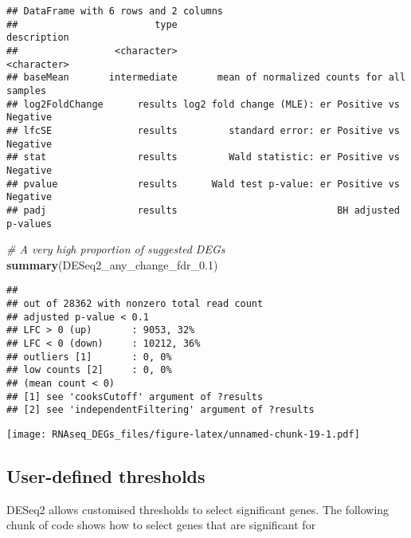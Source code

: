 \documentclass[]{book}
\newenvironment{Shaded}{\begin{snugshade}}{\end{snugshade}}
\newcommand{\KeywordTok}[1]{\textcolor[rgb]{0.13,0.29,0.53}{\textbf{#1}}}
\newcommand{\FloatTok}[1]{\textcolor[rgb]{0.00,0.00,0.81}{#1}}
\newcommand{\CommentTok}[1]{\textcolor[rgb]{0.56,0.35,0.01}{\textit{#1}}}
\newcommand{\OperatorTok}[1]{\textcolor[rgb]{0.81,0.36,0.00}{\textbf{#1}}}
\newcommand{\NormalTok}[1]{#1}
\begin{document}
\begin{verbatim}
## DataFrame with 6 rows and 2 columns
##                        type                                     description
##                 <character>                                     <character>
## baseMean       intermediate       mean of normalized counts for all samples
## log2FoldChange      results log2 fold change (MLE): er Positive vs Negative
## lfcSE               results         standard error: er Positive vs Negative
## stat                results         Wald statistic: er Positive vs Negative
## pvalue              results      Wald test p-value: er Positive vs Negative
## padj                results                            BH adjusted p-values
\end{verbatim}

\begin{Shaded}
\begin{Highlighting}[]
\CommentTok{# A very high proportion of suggested DEGs}
\KeywordTok{summary}\NormalTok{(DESeq2_any_change_fdr_}\FloatTok{0.1}\NormalTok{)}
\end{Highlighting}
\end{Shaded}

\begin{verbatim}
## 
## out of 28362 with nonzero total read count
## adjusted p-value < 0.1
## LFC > 0 (up)       : 9053, 32%
## LFC < 0 (down)     : 10212, 36%
## outliers [1]       : 0, 0%
## low counts [2]     : 0, 0%
## (mean count < 0)
## [1] see 'cooksCutoff' argument of ?results
## [2] see 'independentFiltering' argument of ?results
\end{verbatim}

\begin{Shaded}
\end{Shaded}

\texttt{[image: RNAseq\_DEGs\_files/figure-latex/unnamed-chunk-19-1.pdf]}

\subsection{User-defined thresholds}\label{user-defined-thresholds}

DESeq2 allows customised thresholds to select significant genes. The
following chunk of code shows how to select genes that are significant
for
\end{document}
